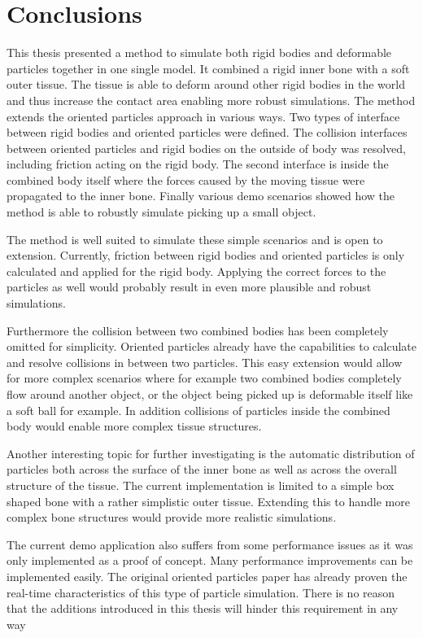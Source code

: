 \chapter{Conclusions}
\label{cha:conclusions}

This thesis presented a method to simulate both rigid bodies and deformable particles together in one single model. It combined a rigid inner bone with a soft outer tissue. The tissue is able to deform around other rigid bodies in the world and thus increase the contact area enabling more robust simulations. The method extends the oriented particles approach in various ways. Two types of interface between rigid bodies and oriented particles were defined. The collision interfaces between oriented particles and rigid bodies on the outside of body was resolved, including friction acting on the rigid body. The second interface is inside the combined body itself where the forces caused by the moving tissue were propagated to the inner bone. Finally various demo scenarios showed how the method is able to robustly simulate picking up a small object.

The method is well suited to simulate these simple scenarios and is open to extension. Currently, friction between rigid bodies and oriented particles is only calculated and applied for the rigid body. Applying the correct forces to the particles as well would probably result in even more plausible and robust simulations.

Furthermore the collision between two combined bodies has been completely omitted for simplicity. Oriented particles already have the capabilities to calculate and resolve collisions in between two particles. This easy extension would allow for more complex scenarios where for example two combined bodies completely flow around another object, or the object being picked up is deformable itself like a soft ball for example. In addition collisions of particles inside the combined body would enable more complex tissue structures.

Another interesting topic for further investigating is the automatic distribution of particles both across the surface of the inner bone as well as across the overall structure of the tissue. The current implementation is limited to a simple box shaped bone with a rather simplistic outer tissue. Extending this to handle more complex bone structures would provide more realistic simulations.

The current demo application also suffers from some performance issues as it was only implemented as a proof of concept. Many performance improvements can be implemented easily. The original oriented particles paper has already proven the real-time characteristics of this type of particle simulation. There is no reason that the additions introduced in this thesis will hinder this requirement in any way